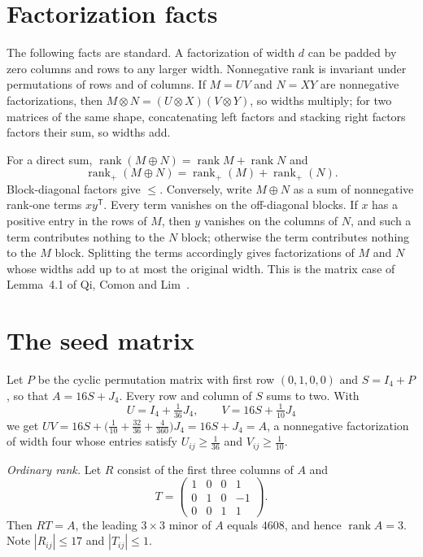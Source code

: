\documentclass[11pt]{article}
\theoremstyle{remark}
\newcommand{\rk}{\operatorname{rank}}
\newcommand{\rp}{\operatorname{rank}_+}
\begin{document}
\section{Factorization facts}\label{sec:facts}

The following facts are standard. A factorization of width $d$ can be padded by zero columns and rows to any larger width. Nonnegative rank is invariant under permutations of rows and of columns. If $M=UV$ and $N=XY$ are nonnegative factorizations, then $M\otimes N=(U\otimes X)(V\otimes Y)$, so widths multiply; for two matrices of the same shape, concatenating left factors and stacking right factors factors their sum, so widths add.

For a direct sum, $\rk(M\oplus N)=\rk M+\rk N$ and
\begin{equation}\label{eq:directsum}
\rp(M\oplus N)=\rp(M)+\rp(N).
\end{equation}
Block-diagonal factors give $\le$. Conversely, write $M\oplus N$ as a sum of nonnegative rank-one terms $xy^{\mathsf T}$. Every term vanishes on the off-diagonal blocks. If $x$ has a positive entry in the rows of $M$, then $y$ vanishes on the columns of $N$, and such a term contributes nothing to the $N$ block; otherwise the term contributes nothing to the $M$ block. Splitting the terms accordingly gives factorizations of $M$ and $N$ whose widths add up to at most the original width. This is the matrix case of Lemma~4.1 of Qi, Comon and Lim~\cite{QCL}.

\section{The seed matrix}\label{sec:seed}

Let $P$ be the cyclic permutation matrix with first row $(0,1,0,0)$ and $S=I_4+P$, so that $A=16S+J_4$. Every row and column of $S$ sums to two. With
\[
U=I_4+\tfrac{1}{36}J_4,\qquad V=16S+\tfrac{1}{10}J_4
\]
we get $UV=16S+\bigl(\tfrac{1}{10}+\tfrac{32}{36}+\tfrac{4}{360}\bigr)J_4=16S+J_4=A$, a nonnegative factorization of width four whose entries satisfy $U_{ij}\ge\tfrac{1}{36}$ and $V_{ij}\ge\tfrac{1}{10}$.

\emph{Ordinary rank.} Let $R$ consist of the first three columns of $A$ and
\[
T=\begin{pmatrix}1&0&0&1\\0&1&0&-1\\0&0&1&1\end{pmatrix}.
\]
Then $RT=A$, the leading $3\times3$ minor of $A$ equals $4608$, and hence $\rk A=3$. Note $|R_{ij}|\le17$ and $|T_{ij}|\le1$.
\end{document}
